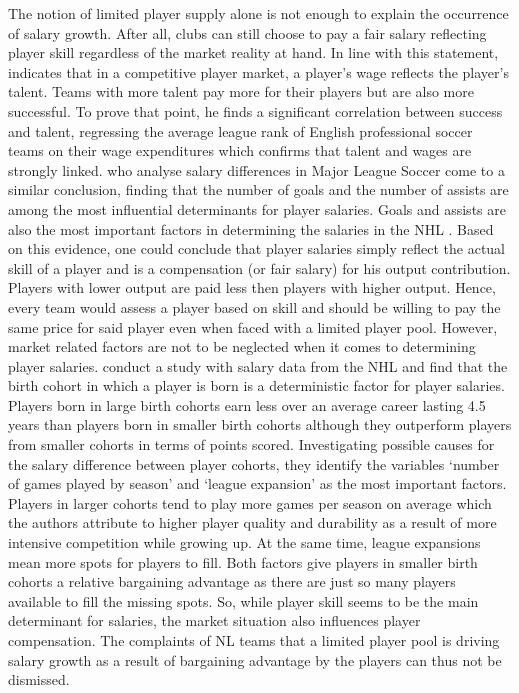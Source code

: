 \documentclass[12pt,a4paper]{article}\usepackage[]{graphicx}\usepackage[]{xcolor}
\begin{document}
The notion of limited player supply alone is not enough to explain the occurrence of salary growth. After all, clubs can still choose to pay a fair salary reflecting player skill regardless of the market reality at hand. In line with this statement, \citet{szymanski_market_2000} indicates that in a competitive player market, a player's wage reflects the player's talent. Teams with more talent pay more for their players but are also more successful. To prove that point, he finds a significant correlation between success and talent, regressing the average league rank of English professional soccer teams on their wage expenditures which confirms that talent and wages are strongly linked. \citet{celik_salary_2017} who analyse salary differences in Major League Soccer come to a similar conclusion, finding that the number of goals and the number of assists are among the most influential determinants for player salaries. Goals and assists are also the most important factors in determining the salaries in the NHL \citep{coates_returns_2017}. Based on this evidence, one could conclude that player salaries simply reflect the actual skill of a player and is a compensation (or fair salary) for his output contribution. Players with lower output are paid less then players with higher output. Hence, every team would assess a player based on skill and should be willing to pay the same price for said player even when faced with a limited player pool. However, market related factors are not to be neglected when it comes to determining player salaries. \citet{bryson_all-star_2017} conduct a study with salary data from the NHL and find that the birth cohort in which a player is born is a deterministic factor for player salaries. Players born in large birth cohorts earn less over an average career lasting 4.5 years than players born in smaller birth cohorts although they outperform players from smaller cohorts in terms of points scored. Investigating possible causes for the salary difference between player cohorts, they identify the variables ‘number of games played by season’ and ‘league expansion’ as the most important factors. Players in larger cohorts tend to play more games per season on average which the authors attribute to higher player quality and durability as a result of more intensive competition while growing up. At the same time, league expansions mean more spots for players to fill. Both factors give players in smaller birth cohorts a relative bargaining advantage as there are just so many players available to fill the missing spots. So, while player skill seems to be the main determinant for salaries, the market situation also influences player compensation. The complaints of NL teams that a limited player pool is driving salary growth as a result of bargaining advantage by the players can thus not be dismissed.  
\end{document}
